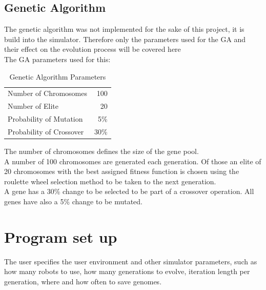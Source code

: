 \subsection{Genetic Algorithm}
The genetic algorithm was not implemented for the sake of this project, it is build into the simulator. Therefore only the parameters used for the GA and their effect on the evolution process will be covered here \\
The GA parameters used for this:\\

\begin{table}[h]
\begin{center}
\begin{tabular}{l r}
Number of Chromosomes & 100 \\
Number of Elite & 20\\
Probability of Mutation & 5\%\\
Probability of Crossover & 30\%\\
\end{tabular}
\caption{Genetic Algorithm Parameters}
\end{center}
\end{table}

The number of chromosomes defines the size of the gene pool. \\
A number of 100 chromosomes are generated each generation. Of those an elite of 20 chromosomes with the best assigned fitness function is chosen using the roulette wheel selection method to be taken to the next generation.\\
A gene has a 30\% change to be selected to be part of a crossover operation.
All genes have also a 5\% change to be mutated. 

\section{Program set up}
The user specifies the user environment and other simulator parameters, such as how many robots to use, how many generations to evolve, iteration length per generation, where and how often to save genomes. \\

